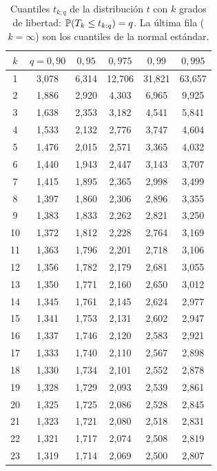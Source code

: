 \begin{table}[ht]
\centering\small
\caption{Cuantiles $t_{k;q}$ de la distribución $t$ con $k$ grados de libertad: $\mathbb{P}(T_k\le t_{k;q})=q$. La última fila ($k=\infty$) son los cuantiles de la normal estándar.}\label{tab:t}
\begin{tabular}{@{}c|ccccc@{}}
\toprule
$k$ & $q=0{,}90$ & $0{,}95$ & $0{,}975$ & $0{,}99$ & $0{,}995$ \\
\midrule
1 & 3{,}078 & 6{,}314 & 12{,}706 & 31{,}821 & 63{,}657 \\
2 & 1{,}886 & 2{,}920 & 4{,}303 & 6{,}965 & 9{,}925 \\
3 & 1{,}638 & 2{,}353 & 3{,}182 & 4{,}541 & 5{,}841 \\
4 & 1{,}533 & 2{,}132 & 2{,}776 & 3{,}747 & 4{,}604 \\
5 & 1{,}476 & 2{,}015 & 2{,}571 & 3{,}365 & 4{,}032 \\
6 & 1{,}440 & 1{,}943 & 2{,}447 & 3{,}143 & 3{,}707 \\
7 & 1{,}415 & 1{,}895 & 2{,}365 & 2{,}998 & 3{,}499 \\
8 & 1{,}397 & 1{,}860 & 2{,}306 & 2{,}896 & 3{,}355 \\
9 & 1{,}383 & 1{,}833 & 2{,}262 & 2{,}821 & 3{,}250 \\
10 & 1{,}372 & 1{,}812 & 2{,}228 & 2{,}764 & 3{,}169 \\
11 & 1{,}363 & 1{,}796 & 2{,}201 & 2{,}718 & 3{,}106 \\
12 & 1{,}356 & 1{,}782 & 2{,}179 & 2{,}681 & 3{,}055 \\
13 & 1{,}350 & 1{,}771 & 2{,}160 & 2{,}650 & 3{,}012 \\
14 & 1{,}345 & 1{,}761 & 2{,}145 & 2{,}624 & 2{,}977 \\
15 & 1{,}341 & 1{,}753 & 2{,}131 & 2{,}602 & 2{,}947 \\
16 & 1{,}337 & 1{,}746 & 2{,}120 & 2{,}583 & 2{,}921 \\
17 & 1{,}333 & 1{,}740 & 2{,}110 & 2{,}567 & 2{,}898 \\
18 & 1{,}330 & 1{,}734 & 2{,}101 & 2{,}552 & 2{,}878 \\
19 & 1{,}328 & 1{,}729 & 2{,}093 & 2{,}539 & 2{,}861 \\
20 & 1{,}325 & 1{,}725 & 2{,}086 & 2{,}528 & 2{,}845 \\
21 & 1{,}323 & 1{,}721 & 2{,}080 & 2{,}518 & 2{,}831 \\
22 & 1{,}321 & 1{,}717 & 2{,}074 & 2{,}508 & 2{,}819 \\
23 & 1{,}319 & 1{,}714 & 2{,}069 & 2{,}500 & 2{,}807 \\

\end{tabular}
\end{table}
